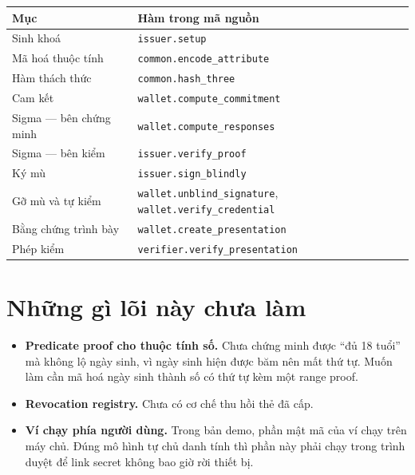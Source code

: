 \documentclass[a4paper,11pt]{article}
\theoremstyle{definition}
\theoremstyle{plain}
\theoremstyle{remark}
\begin{document}
\begin{center}
\begin{tabular}{@{}ll@{}}
\toprule
\textbf{Mục} & \textbf{Hàm trong mã nguồn} \\
\midrule
Sinh khoá & \texttt{issuer.setup} \\
Mã hoá thuộc tính & \texttt{common.encode\_attribute} \\
Hàm thách thức & \texttt{common.hash\_three} \\
Cam kết & \texttt{wallet.compute\_commitment} \\
Sigma --- bên chứng minh & \texttt{wallet.compute\_responses} \\
Sigma --- bên kiểm & \texttt{issuer.verify\_proof} \\
Ký mù & \texttt{issuer.sign\_blindly} \\
Gỡ mù và tự kiểm & \texttt{wallet.unblind\_signature}, \texttt{wallet.verify\_credential} \\
Bằng chứng trình bày & \texttt{wallet.create\_presentation} \\
Phép kiểm & \texttt{verifier.verify\_presentation} \\
\bottomrule
\end{tabular}
\end{center}

\section{Những gì lõi này chưa làm}

\begin{itemize}[leftmargin=1.2em,itemsep=4pt]
  \item \textbf{Predicate proof cho thuộc tính số.} Chưa chứng minh được ``đủ 18 tuổi''
        mà không lộ ngày sinh, vì ngày sinh hiện được băm nên mất thứ tự. Muốn làm cần mã
        hoá ngày sinh thành số có thứ tự kèm một range proof.
  \item \textbf{Revocation registry.} Chưa có cơ chế thu hồi thẻ đã cấp.
  \item \textbf{Ví chạy phía người dùng.} Trong bản demo, phần mật mã của ví chạy trên máy
        chủ. Đúng mô hình tự chủ danh tính thì phần này phải chạy trong trình duyệt để
        link secret không bao giờ rời thiết bị.
\end{itemize}
\end{document}
